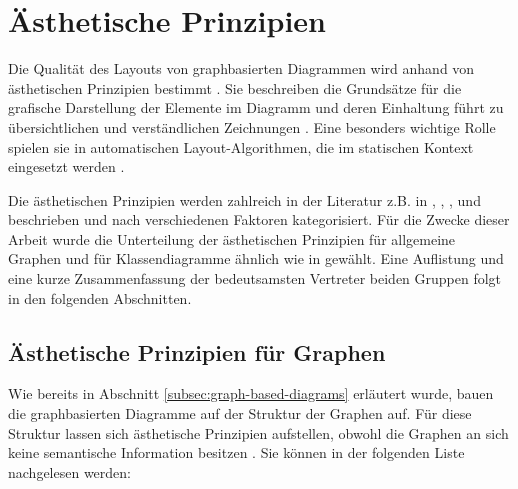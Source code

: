 
\section{Ästhetische Prinzipien}
\label{sec:aesthetics-criteria}

Die Qualität des Layouts von graphbasierten Diagrammen wird anhand von ästhetischen Prinzipien bestimmt \cite{Maier12A-Pattern-based}. Sie beschreiben die Grundsätze für die grafische Darstellung der Elemente im Diagramm und deren Einhaltung führt zu übersichtlichen und verständlichen Zeichnungen \cite{Siebenhaller03Automatisches}. Eine besonders wichtige Rolle spielen sie in automatischen Layout-Algorithmen, die im statischen Kontext eingesetzt werden \cite{Maier12A-Pattern-based}.

Die ästhetischen Prinzipien werden zahlreich in der Literatur z.B. in \cite{Siebenhaller03Automatisches}, \cite{EichelbergerSchmid09Guidelines}, \cite{Ambler05The-Elements}, \cite{Eichelberger05Aesthetics} und \cite{ShieberKosak93Automating} beschrieben und nach verschiedenen Faktoren kategorisiert. Für die Zwecke dieser Arbeit wurde die Unterteilung der ästhetischen Prinzipien für allgemeine Graphen und für Klassendiagramme ähnlich wie in \cite{Siebenhaller03Automatisches} gewählt. Eine Auflistung und eine kurze Zusammenfassung der bedeutsamsten Vertreter beiden Gruppen folgt in den folgenden Abschnitten.

\subsection{Ästhetische Prinzipien für Graphen}
\label{subsec:aesthetics-criteria-graphs}

Wie bereits in Abschnitt \ref{subsec:graph-based-diagrams} erläutert wurde, bauen die graphbasierten Diagramme auf der Struktur der Graphen auf. Für diese Struktur lassen sich ästhetische Prinzipien aufstellen, obwohl die Graphen an sich keine semantische Information besitzen \cite{Siebenhaller03Automatisches}. Sie können in der folgenden Liste nachgelesen werden:

